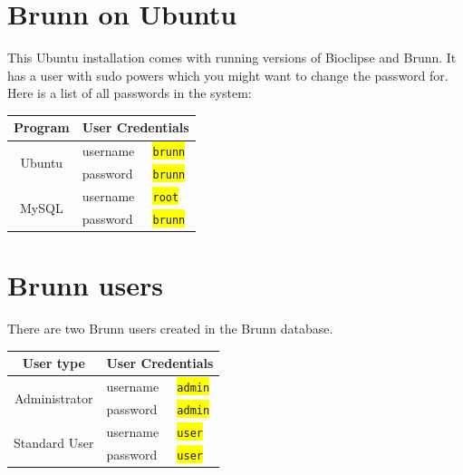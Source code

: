 \documentclass[12pt, a4paper, twoside, openany]{article}
\begin{document}
    \allsectionsfont{\sffamily}

    \setlength{\parindent}{0 em}
    \setlength{\parskip}{1.5 ex plus 1 ex minus 1 ex}

    \section*{Brunn on Ubuntu}

    This Ubuntu installation comes with running versions of Bioclipse and
    Brunn. It has a user with sudo powers which you might want to change the
    password for. Here is a list of all passwords in the system: 

    \begin{center}
        \begin{tabular}{|c|l|l|}
        \hline
        Program & \multicolumn{2}{|c|}{User Credentials} \\
        \hline
        \multirow{2}{*}{Ubuntu} & username 
                                & \colorbox{yellow}{\texttt{brunn}} \\
                                & password 
                                & \colorbox{yellow}{\texttt{brunn}} \\
        \hline
        \multirow{2}{*}{MySQL}  & username 
                                & \colorbox{yellow}{\texttt{root}}  \\
                                & password 
                                & \colorbox{yellow}{\texttt{brunn}} \\
        \hline
        \end{tabular}
    \end{center}

    \section*{Brunn users}
    There are two Brunn users created in the Brunn database.

    \begin{center}
        \begin{tabular}{|c|l|l|}
            \hline
            User type & \multicolumn{2}{|c|}{User Credentials} \\
            \hline
            \multirow{2}{*}{Administrator} 
                           & username 
                           & \colorbox{yellow}{\texttt{admin}} \\
                           & password 
                           & \colorbox{yellow}{\texttt{admin}} \\
            \hline
            \multirow{2}{*}{Standard User} 
                           & username 
                           & \colorbox{yellow}{\texttt{user}}  \\
                           & password 
                           & \colorbox{yellow}{\texttt{user}}  \\
            \hline
        \end{tabular}
    \end{center}
\end{document}

